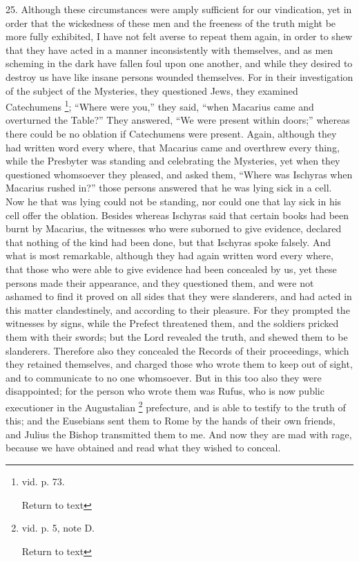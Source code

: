 25. Although these circumstances were amply
sufficient for our vindication, yet in order that the wickedness of
these men and the freeness of the truth might be more fully exhibited,
I have not felt averse to repeat them again, in order to shew that
they have acted in a manner inconsistently with themselves, and as men
scheming in the dark have fallen foul upon one another, and while they
desired to destroy us have like insane persons wounded themselves. For
in their investigation of the subject of the Mysteries, they
questioned Jews, they examined Catechumens \footnote{vid. p. 73.

Return to text}; ``Where were you,'' they said, ``when Macarius came and
overturned the Table?'' They answered, ``We were present within doors;''
whereas there could be no oblation if Catechumens were present. Again,
although they had written word every where, that Macarius came and
overthrew every thing, while the Presbyter was standing and
celebrating the Mysteries, yet when they questioned whomsoever they
pleased, and asked them, ``Where was Ischyras when Macarius rushed in?''
those persons answered that he was lying sick in a cell. Now he that
was lying could not be standing, nor could one that lay sick in his
cell offer the oblation. Besides whereas Ischyras said that certain
books had been burnt by Macarius, the witnesses who were suborned to
give evidence, declared that nothing of the kind had been done, but
that Ischyras spoke falsely. And what is most remarkable, although
they had again written word every where, that those who were able to
give evidence had been concealed by us, yet these persons made their
appearance, and they questioned them, and were not ashamed to find it
proved on all sides that they were slanderers, and had acted in
this matter clandestinely, and according to their pleasure. For they
prompted the witnesses by signs, while the Prefect threatened them,
and the soldiers pricked them with their swords; but the Lord revealed
the truth, and shewed them to be slanderers. Therefore also they
concealed the Records of their proceedings, which they retained
themselves, and charged those who wrote them to keep out of sight, and
to communicate to no one whomsoever. But in this too also they were
disappointed; for the person who wrote them was Rufus, who is now
public executioner in the Augustalian \footnote{vid. p. 5, note D.

Return to text} prefecture, and is able to testify to the truth of this; and
the Eusebians sent them to Rome by the hands of their own friends, and
Julius the Bishop transmitted them to me. And now they are mad with
rage, because we have obtained and read what they wished to conceal.

